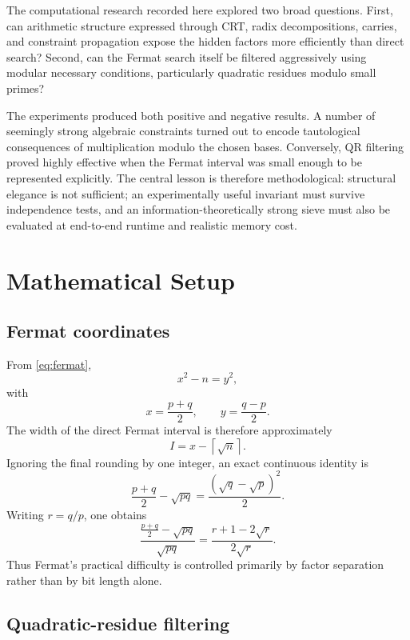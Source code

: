 \documentclass[11pt,a4paper]{article}
\begin{document}
The computational research recorded here explored two broad questions. First, can arithmetic structure expressed through CRT, radix decompositions, carries, and constraint propagation expose the hidden factors more efficiently than direct search? Second, can the Fermat search itself be filtered aggressively using modular necessary conditions, particularly quadratic residues modulo small primes?

The experiments produced both positive and negative results. A number of seemingly strong algebraic constraints turned out to encode tautological consequences of multiplication modulo the chosen bases. Conversely, QR filtering proved highly effective when the Fermat interval was small enough to be represented explicitly. The central lesson is therefore methodological: structural elegance is not sufficient; an experimentally useful invariant must survive independence tests, and an information-theoretically strong sieve must also be evaluated at end-to-end runtime and realistic memory cost.

\section{Mathematical Setup}

\subsection{Fermat coordinates}

From \eqref{eq:fermat},
\[
 x^2-n=y^2,
\]
with
\[
 x=\frac{p+q}{2},
 \qquad
 y=\frac{q-p}{2}.
\]
The width of the direct Fermat interval is therefore approximately
\[
 I=x-\left\lceil\sqrt n\right\rceil.
\]
Ignoring the final rounding by one integer, an exact continuous identity is
\begin{equation}
 \frac{p+q}{2}-\sqrt{pq}
 =
 \frac{(\sqrt q-\sqrt p)^2}{2}.
\label{eq:interval}
\end{equation}
Writing $r=q/p$, one obtains
\begin{equation}
 \frac{\frac{p+q}{2}-\sqrt{pq}}{\sqrt{pq}}
 =
 \frac{r+1-2\sqrt r}{2\sqrt r}.
\label{eq:normalizedinterval}
\end{equation}
Thus Fermat's practical difficulty is controlled primarily by factor separation rather than by bit length alone.

\subsection{Quadratic-residue filtering}
\end{document}
